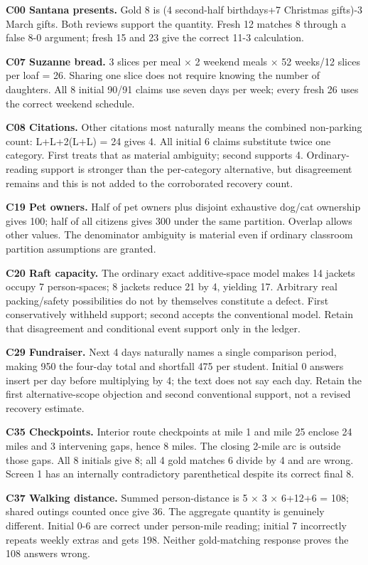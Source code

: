 \documentclass[11pt,a4paper]{article}
\begin{document}
\textbf{C00 Santana presents.} Gold 8 is (4 second-half birthdays+7
Christmas gifts)-3 March gifts. Both reviews support the quantity. Fresh
12 matches 8 through a false 8-0 argument; fresh 15 and 23 give the
correct 11-3 calculation.

\textbf{C07 Suzanne bread.} 3 slices per meal × 2 weekend meals × 52
weeks/12 slices per loaf = 26. Sharing one slice does not require
knowing the number of daughters. All 8 initial 90/91 claims use seven
days per week; every fresh 26 uses the correct weekend schedule.

\textbf{C08 Citations.} Other citations most naturally means the
combined non-parking count: L+L+2(L+L) = 24 gives 4. All initial 6
claims substitute twice one category. First treats that as material
ambiguity; second supports 4. Ordinary-reading support is stronger than
the per-category alternative, but disagreement remains and this is not
added to the corroborated recovery count.

\textbf{C19 Pet owners.} Half of pet owners plus disjoint exhaustive
dog/cat ownership gives 100; half of all citizens gives 300 under the
same partition. Overlap allows other values. The denominator ambiguity
is material even if ordinary classroom partition assumptions are
granted.

\textbf{C20 Raft capacity.} The ordinary exact additive-space model
makes 14 jackets occupy 7 person-spaces; 8 jackets reduce 21 by 4,
yielding 17. Arbitrary real packing/safety possibilities do not by
themselves constitute a defect. First conservatively withheld support;
second accepts the conventional model. Retain that disagreement and
conditional event support only in the ledger.

\textbf{C29 Fundraiser.} Next 4 days naturally names a single comparison
period, making 950 the four-day total and shortfall 475 per student.
Initial 0 answers insert per day before multiplying by 4; the text does
not say each day. Retain the first alternative-scope objection and
second conventional support, not a revised recovery estimate.

\textbf{C35 Checkpoints.} Interior route checkpoints at mile 1 and mile
25 enclose 24 miles and 3 intervening gaps, hence 8 miles. The closing
2-mile arc is outside those gaps. All 8 initials give 8; all 4 gold
matches 6 divide by 4 and are wrong. Screen 1 has an internally
contradictory parenthetical despite its correct final 8.

\textbf{C37 Walking distance.} Summed person-distance is 5 × 3 × 6+12+6
= 108; shared outings counted once give 36. The aggregate quantity is
genuinely different. Initial 0-6 are correct under person-mile reading;
initial 7 incorrectly repeats weekly extras and gets 198. Neither
gold-matching response proves the 108 answers wrong.
\end{document}
